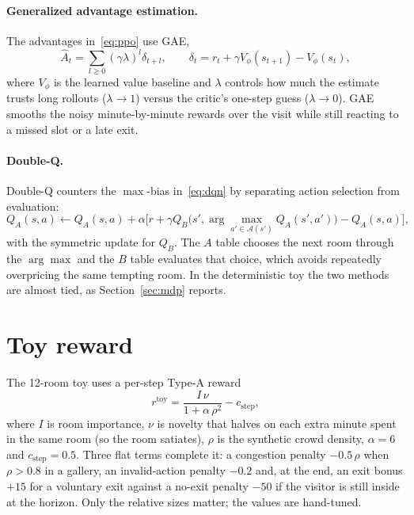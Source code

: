 \documentclass[11pt]{article}
\numberwithin{equation}{section} %
\newcommand{\Acal}{\mathcal{A}}
\begin{document}
\paragraph{Generalized advantage estimation.}
The advantages in~\eqref{eq:ppo} use GAE,
\begin{equation}
\hat A_t=\sum_{l\ge0}(\gamma\lambda)^l\delta_{t+l},
\qquad
\delta_t=r_t+\gamma V_\phi(s_{t+1})-V_\phi(s_t),
\label{eq:gae}
\end{equation}
where $V_\phi$ is the learned value baseline and $\lambda$ controls how much the estimate trusts long rollouts
($\lambda\to1$) versus the critic's one-step guess ($\lambda\to0$). GAE smooths the noisy minute-by-minute
rewards over the visit while still reacting to a missed slot or a late exit.

\paragraph{Double-Q.}
Double-Q \citep{sutton2018} counters the $\max$-bias in~\eqref{eq:dqn} by separating action selection from
evaluation:
\begin{equation}
Q_A(s,a)\leftarrow Q_A(s,a)+\alpha\Big[
r+\gamma Q_B\big(s',\arg\max_{a'\in\Acal(s')}Q_A(s',a')\big)-Q_A(s,a)\Big],
\label{eq:doubleq}
\end{equation}
with the symmetric update for $Q_B$. The $A$ table chooses the next room through the $\arg\max$ and the $B$
table evaluates that choice, which avoids repeatedly overpricing the same tempting room. In the deterministic
toy the two methods are almost tied, as Section~\ref{sec:mdp} reports.

\section{Toy reward}
\label{app:toyreward}

The 12-room toy uses a per-step Type-A reward
\begin{equation}
r^{\text{toy}}=\frac{I\,\nu}{1+\alpha\,\rho^2}-c_{\text{step}},
\label{eq:toyreward}
\end{equation}
where $I$ is room importance, $\nu$ is novelty that halves on each extra minute spent in the same room (so the
room satiates), $\rho$ is the synthetic crowd density, $\alpha=6$ and $c_{\text{step}}=0.5$. Three flat terms
complete it: a congestion penalty $-0.5\,\rho$ when $\rho>0.8$ in a gallery, an invalid-action penalty $-0.2$
and, at the end, an exit bonus $+15$ for a voluntary exit against a no-exit penalty $-50$ if the visitor is
still inside at the horizon. Only the relative sizes matter; the values are hand-tuned.
\end{document}

